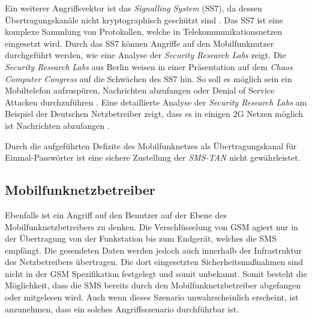 \documentclass[11pt,a4paper,ngerman]{scrreprt}
\begin{document}
Ein weiterer Angriffsvektor ist das \textit{Signalling System} (SS7), da dessen Übertragungskanäle nicht kryptographisch geschützt sind \cite[S.\,202]{komSec13}. Das SS7 ist eine komplexe Sammlung von Protokollen, welche in Telekommunikationsnetzen eingesetzt wird. Durch das SS7 können Angriffe auf den Mobilfunknutzer durchgeführt werden, wie eine Analyse der \textit{Security Research Labs} zeigt. Die \textit{Security Research Labs} aus Berlin weisen in einer Präsentation auf dem \textit{Chaos Computer Congress} auf die Schwächen des SS7 hin. So soll es möglich sein ein Mobiltelefon aufzuspüren, Nachrichten abzufangen oder Denial of Service Attacken durchzuführen \cite{cccMob}. Eine detaillierte Analyse der \textit{Security Research Labs} am Beispiel der Deutschen Netzbetreiber zeigt, dass es in einigen 2G Netzen möglich ist Nachrichten abzufangen \cite{srlMobSec}.

Durch die aufgeführten Defizite des Mobilfunknetzes als Übertragungskanal für Einmal-Passwörter ist eine sichere Zustellung der \textit{SMS-TAN} nicht gewährleistet.
\subsection{Mobilfunknetzbetreiber}
Ebenfalls ist ein Angriff auf den Benutzer auf der Ebene des Mobilfunknetzbetreibers zu denken. Die Verschlüsselung von GSM agiert nur in der Übertragung von der Funkstation bis zum Endgerät, welches die SMS empfängt. Die gesendeten Daten werden jedoch auch innerhalb der Infrastruktur des Netzbetreibers übertragen. Die dort eingesetzten Sicherheitsmaßnahmen sind nicht in der GSM Spezifikation festgelegt und somit unbekannt. Somit besteht die Möglichkeit, dass die SMS bereits durch den Mobilfunknetzbetreiber abgefangen oder mitgelesen wird. Auch wenn dieses Szenario unwahrscheinlich erscheint, ist anzunehmen, dass ein solches Angriffsszenario durchführbar ist.
\end{document}
